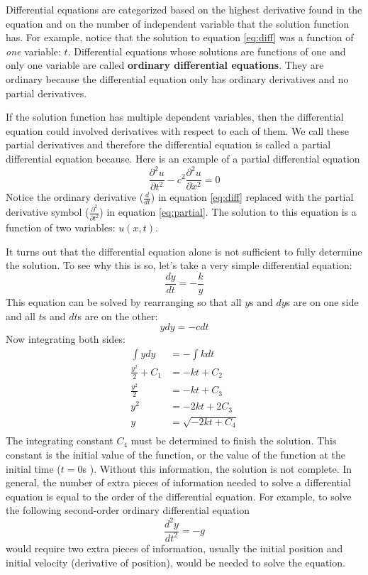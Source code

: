 Differential equations are categorized based on the highest derivative
found in the equation and on the number of independent variable that
the solution function has.  For example, notice that the solution to equation
\eqref{eq:diff} was a function of {\it one } variable: $t$.
Differential equations whose solutions are functions of one and only
one variable are called \textbf{ordinary differential equations}.
They are ordinary because the differential equation only has ordinary
derivatives and no partial derivatives.

If the solution function has multiple dependent variables, then the
differential equation could involved derivatives with respect to each
of them.  We call these partial derivatives and therefore the
differential equation is called a partial differential equation
because.  Here is an example of a partial differential equation
\begin{equation}\label{eq:partial}
\frac{\partial^2u}{\partial t^2} - c^2 \frac{\partial^2 u}{\partial x^2} = 0  
\end{equation}
Notice the ordinary derivative ($\frac{d}{dt}$) in equation
\eqref{eq:diff} replaced with the partial derivative symbol
($\frac{\partial^2}{\partial t^2}$) in equation \eqref{eq:partial}.
The solution to this equation is a function of two variables:
$u(x,t)$.

It turns out that the differential equation alone is not sufficient to fully determine
the solution. To see why this is so, let's take a very simple differential equation:
\begin{equation}
\frac{dy}{dt} = -\frac{k}{y}
\end{equation}
This equation can be solved by rearranging so that all $y$s and $dy$s
are on one side and all $t$s and $dt$s are on the other:
\begin{equation}
y dy = - c dt
\end{equation}
Now integrating both sides:
\begin{align}
\int y dy &= - \int k dt\\
\frac{y^2}{2} +C_1 &= - k t + C_2\\
\frac{y^2}{2} &= - k t + C_3\\
y^2 &= - 2 k t + 2 C_3\\
y &= \sqrt{- 2 k t + C_4}\\
\end{align}
The integrating constant $C_4$ must be determined to finish the
solution.  This constant is the initial value of the function, or the
value of the function at the initial time ($t=0$s ).  Without this
information, the solution is not complete.  In general, the number of
extra pieces of information needed to solve a differential equation is
equal to the order of the differential equation.  For example, to
solve the following second-order ordinary differential equation
\begin{equation}\label{eq:projectile}
\frac{d^2 y}{dt^2} = - g
\end{equation}
would require two extra pieces of information, usually the initial
position and initial velocity (derivative of position), would be
needed to solve the equation.

